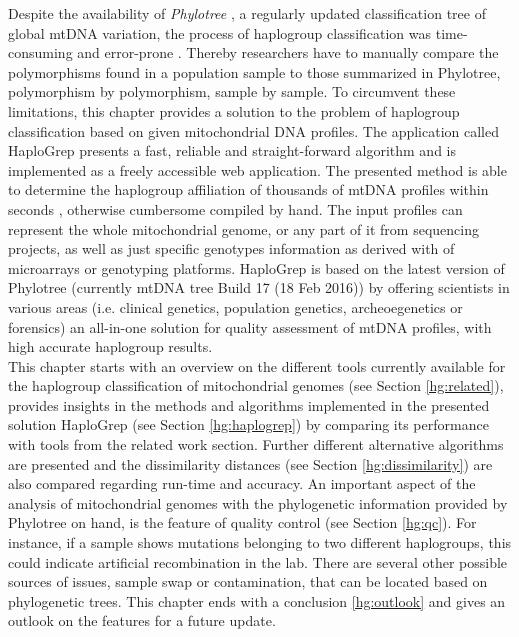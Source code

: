 Despite the availability of \textit{Phylotree} \cite{VanOven2009}, a regularly updated classification tree of global mtDNA variation, the process of haplogroup classification was time-consuming and error-prone \cite{Kloss-Brandstatter2011}. Thereby researchers have to manually compare the polymorphisms found in a population sample to those summarized in Phylotree, polymorphism by polymorphism, sample by sample. To circumvent these limitations, this chapter provides a solution to the problem of haplogroup classification based on given mitochondrial DNA profiles. The application called HaploGrep presents a fast, reliable and straight-forward algorithm and is implemented as a freely accessible web application. The presented method is able to determine the haplogroup affiliation of thousands of mtDNA profiles within seconds \cite{Kloss-Brandstatter2011}, otherwise cumbersome compiled by hand. The input profiles can represent the whole mitochondrial genome, or any part of it from sequencing projects, as well as just specific genotypes information as derived with of microarrays or genotyping platforms. HaploGrep is based on the latest version of Phylotree (currently mtDNA tree Build 17 (18 Feb 2016)) by offering scientists in various areas (i.e. clinical genetics, population genetics, archeoegenetics or forensics) an all-in-one solution for quality assessment of mtDNA profiles, with high accurate haplogroup results. \\
This chapter starts with an overview on the different tools currently available for the haplogroup classification of mitochondrial genomes (see Section \ref{hg:related}), provides insights in the methods and algorithms implemented in the presented solution HaploGrep (see Section \ref{hg:haplogrep}) by comparing its performance with tools from the related work section. Further different alternative algorithms are presented and the dissimilarity distances (see Section \ref{hg:dissimilarity}) are also compared regarding run-time and accuracy. An important aspect of the analysis of mitochondrial genomes with the phylogenetic information provided by Phylotree on hand, is the feature of quality control (see Section \ref{hg:qc}). For instance, if a sample shows mutations belonging to two different haplogroups, this could indicate artificial recombination in the lab. There are several other possible sources of issues, sample swap or contamination, that can be located based on phylogenetic trees. This chapter ends with a conclusion \ref{hg:outlook} and gives an outlook on the features for a future update.  
